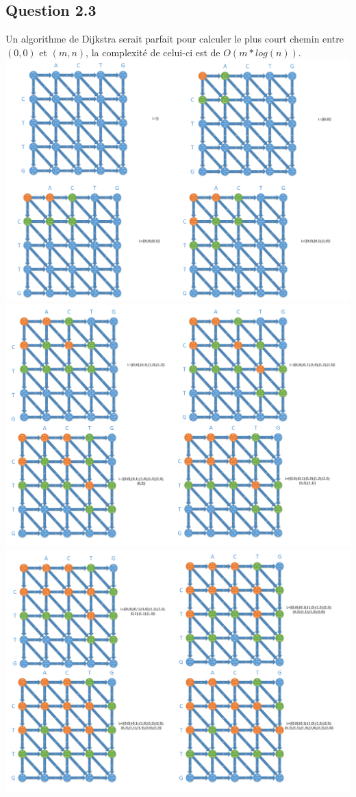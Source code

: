 \documentclass[5pt,a4paper]{report}
\begin{document}
	\subsection*{Question 2.3} 
	Un algorithme de Dijkstra serait parfait pour calculer le plus court chemin entre $(0,0)$ et $(m,n)$, la complexité de celui-ci est de $O(m*log(n))$.\\
	\includegraphics[scale=0.08]{Q23-1}\\
	\includegraphics[scale=0.08]{Q23-2}\\
	\includegraphics[scale=0.08]{Q23-3}\\
\end{document}
